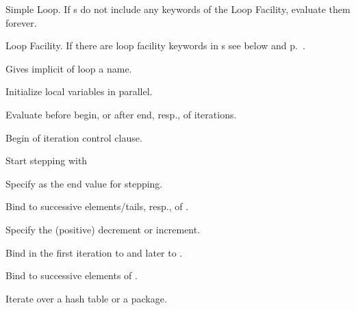 \begin{LIST}{1cm}

  Simple Loop. If s do
  not include any keywords of the Loop Facility, evaluate them forever. 

  Loop Facility. If there are loop facility keywords in s
  see below and p.\ \pageref{loop-overview}.

  \begin{LIST}{.5cm}
    
    Gives implicit  of loop a name.

    Initialize local variables in parallel.

    Evaluate  before begin, or after end, resp., of iterations.

    Begin of iteration control clause.

    \begin{LIST}{.25cm}

      Start stepping with 

      Specify  as the end value for stepping.

      Bind  to successive elements/tails, resp., of .

      Specify the (positive) decrement or increment.

      Bind  in the first iteration to   and later to .

      Bind  to successive elements of .

      Iterate over a hash table or a package.

      \begin{LIST}{.5cm}


\end{LIST}
\end{LIST}
\end{LIST}
\end{LIST}
